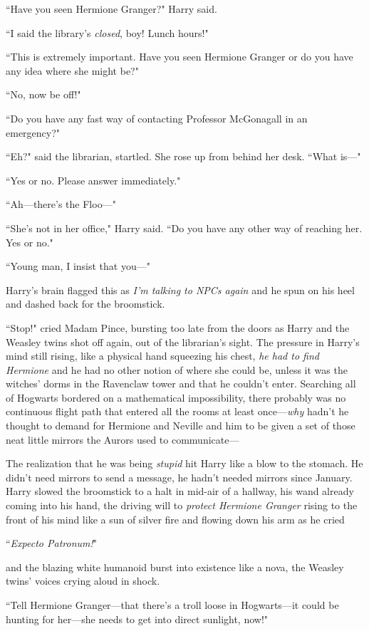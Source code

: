 ``Have you seen Hermione Granger?" Harry said.

``I said the library's \emph{closed}, boy! Lunch hours!"

``This is extremely important. Have you seen Hermione Granger or do you have any idea where she might be?"

``No, now be off!"

``Do you have any fast way of contacting Professor McGonagall in an emergency?"

``Eh?" said the librarian, startled. She rose up from behind her desk. ``What is—"

``Yes or no. Please answer immediately."

``Ah—there's the Floo—"

``She's not in her office," Harry said. ``Do you have any other way of reaching her. Yes or no."

``Young man, I insist that you—"

Harry's brain flagged this as \emph{I'm talking to NPCs again} and he spun on his heel and dashed back for the broomstick.

``Stop!" cried Madam Pince, bursting too late from the doors as Harry and the Weasley twins shot off again, out of the librarian's sight. The pressure in Harry's mind still rising, like a physical hand squeezing his chest, \emph{he had to find Hermione} and he had no other notion of where she could be, unless it was the witches' dorms in the Ravenclaw tower and that he couldn't enter. Searching all of Hogwarts bordered on a mathematical impossibility, there probably was no continuous flight path that entered all the rooms at least once—\emph{why} hadn't he thought to demand for Hermione and Neville and him to be given a set of those neat little mirrors the Aurors used to communicate—

The realization that he was being \emph{stupid} hit Harry like a blow to the stomach. He didn't need mirrors to send a message, he hadn't needed mirrors since January. Harry slowed the broomstick to a halt in mid-air of a hallway, his wand already coming into his hand, the driving will to \emph{protect Hermione Granger} rising to the front of his mind like a sun of silver fire and flowing down his arm as he cried

``\emph{Expecto Patronum!}"

and the blazing white humanoid burst into existence like a nova, the Weasley twins' voices crying aloud in shock.

``Tell Hermione Granger—that there's a troll loose in Hogwarts—it could be hunting for her—she needs to get into direct sunlight, now!"

